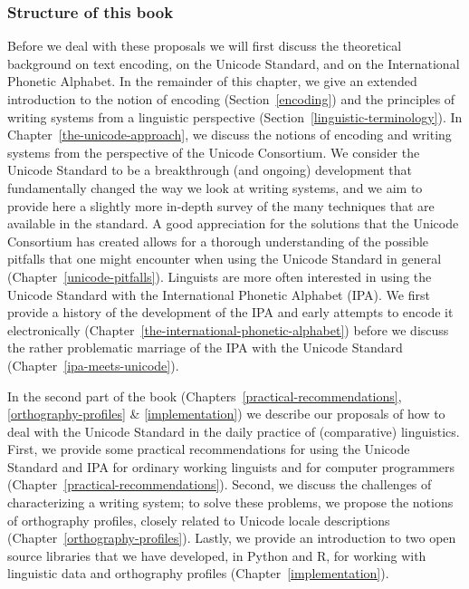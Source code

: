 \subsubsection*{Structure of this book}

Before we deal with these proposals we will first discuss the theoretical
background on text encoding, on the Unicode Standard, and on the International
Phonetic Alphabet. In the remainder of this chapter, we give an extended
introduction to the notion of encoding (Section~\ref{encoding}) and the
principles of writing systems from a linguistic perspective
(Section~\ref{linguistic-terminology}). In Chapter~\ref{the-unicode-approach}, we 
discuss the notions of encoding and writing systems from the perspective of the Unicode
Consortium. We consider the Unicode
Standard to be a breakthrough (and ongoing) development that fundamentally
changed the way we look at writing systems, and we aim to provide here a
slightly more in-depth survey of the many techniques that are available in the
standard. A good appreciation for the solutions that the Unicode Consortium has created 
allows for a thorough understanding of the possible pitfalls that one might
encounter when using the Unicode Standard in general (Chapter~\ref{unicode-pitfalls}). Linguists are more often interested in using the Unicode Standard with the International Phonetic Alphabet (IPA). We first provide a history of the development of the IPA and early attempts to encode it electronically (Chapter~\ref{the-international-phonetic-alphabet}) before we discuss the rather problematic marriage of the IPA with the Unicode Standard (Chapter~\ref{ipa-meets-unicode}).

In the second part of the book (Chapters~\ref{practical-recommendations}, \ref{orthography-profiles} \&
\ref{implementation}) we describe our proposals of how to deal with the Unicode
Standard in the daily practice of (comparative) linguistics. First, we provide some 
practical recommendations for using the Unicode Standard and IPA for ordinary 
working linguists and for computer programmers (Chapter~\ref{practical-recommendations}). 
Second, we discuss the
challenges of characterizing a writing system; to solve these problems, we
propose the notions of orthography profiles, closely related to Unicode locale
descriptions (Chapter~\ref{orthography-profiles}). Lastly, we provide an introduction to two open source libraries that we have developed, in Python and R, for working with linguistic data and orthography profiles (Chapter~\ref{implementation}).


